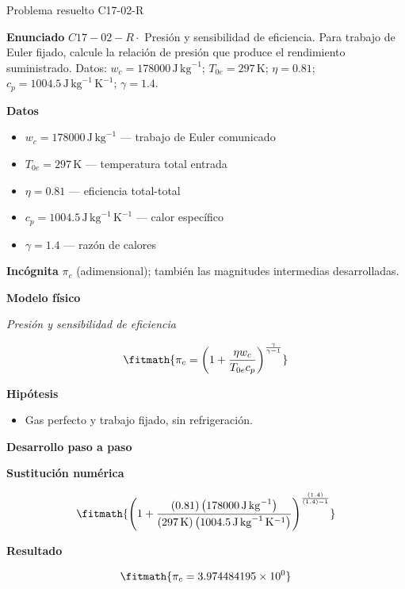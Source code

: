 \documentclass[10pt,openany]{book}
\begin{document}
\begin{studiumworked}{Problema resuelto C17-02-R}


\noindent\textbf{Enunciado}
\(C17-02-R \cdot\) Presión y sensibilidad de eficiencia. Para trabajo de Euler fijado, calcule la relación de presión que produce el rendimiento suministrado. Datos: \(w_c=178000\, \mathrm{J}\,\mathrm{kg}^{-1}\); \(T_{0e}=297\, \mathrm{K}\); \(\eta=0.81\); \(c_p=1004.5\, \mathrm{J}\,\mathrm{kg}^{-1}\,\mathrm{K}^{-1}\); \(\gamma=1.4\).

\noindent\textbf{Datos}
\begin{itemize}
\item $w_c = 178000\,\mathrm{J}\,\mathrm{kg}^{-1}$ — trabajo de Euler comunicado
\item $T_{0e} = 297\,\mathrm{K}$ — temperatura total entrada
\item $\eta = 0.81$ — eficiencia total-total
\item $c_p = 1004.5\,\mathrm{J}\,\mathrm{kg}^{-1}\,\mathrm{K}^{-1}$ — calor específico
\item $\gamma = 1.4$ — razón de calores
\end{itemize}

\noindent\textbf{Incógnita}
$\pi_c$ (adimensional); también las magnitudes intermedias desarrolladas.

\noindent\textbf{Modelo físico}

\noindent\textit{Presión y sensibilidad de eficiencia}

\[
\fitmath{\pi_c=\left(1 + \frac{\eta w_c}{T_{0e} c_p}\right)^{\frac{\gamma}{\gamma - 1}}}
\]

\noindent\textbf{Hipótesis}
\begin{itemize}
\item Gas perfecto y trabajo fijado, sin refrigeración.
\end{itemize}

\noindent\textbf{Desarrollo paso a paso}



\noindent\textbf{Sustitución numérica}

\[
\fitmath{\left(1 + \frac{\left(0.81\right) \left(178000\,\mathrm{J}\,\mathrm{kg}^{-1}\right)}{\left(297\,\mathrm{K}\right) \left(1004.5\,\mathrm{J}\,\mathrm{kg}^{-1}\,\mathrm{K}^{-1}\right)}\right)^{\frac{\left(1.4\right)}{\left(1.4\right) - 1}}}
\]

\noindent\textbf{Resultado}

\[
\fitmath{\pi_c=3.974484195\times10^{0}}
\]


\end{studiumworked}
\end{document}
